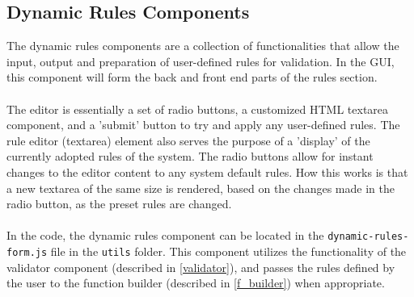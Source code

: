 \subsection{Dynamic Rules Components}
The dynamic rules components are a collection of functionalities that allow the input, output and preparation of user-defined rules for validation. In the GUI, this component will form the back and front end parts of the rules section. 
\\ \\
The editor is essentially a set of radio buttons, a customized HTML textarea component, and a 'submit' button to try and apply any user-defined rules.  The rule editor (textarea) element also serves the purpose of a 'display' of the currently adopted rules of the system. The radio buttons allow for instant changes to the editor content to any system default rules. How this works is that a new textarea of the same size is rendered, based on the changes made in the radio button, as the preset rules are changed. 
\\ \\
In the code, the dynamic rules component can be located in the \texttt{dynamic-rules-form.js} file in the \texttt{utils} folder. This component utilizes the functionality of the validator component (described in \ref{validator}), and passes the rules defined by the user to the function builder (described in \ref{f_builder}) when appropriate.

